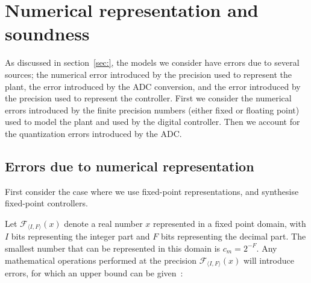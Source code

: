 \documentclass[twocolumn]{autart}    %
\begin{document}
\section{Numerical representation and soundness} 
\label{sec:numeric_rep}

As discussed in section~\ref{sec:}, the models we consider have errors due to several sources; the numerical error introduced by the precision used to represent the plant, the error introduced by the ADC conversion, and the error introduced by the precision used to represent the controller. First we consider the numerical errors introduced by the finite precision numbers (either fixed or floating point) used to model the plant and used by the digital controller. Then we account for the quantization errors introduced by the ADC.

\subsection{Errors due to numerical representation}
First consider the case where we use fixed-point representations, and synthesise fixed-point controllers. 

Let $\mathcal{F}_{\langle I,F \rangle}(x)$ denote a real number $x$
represented in a fixed point domain, with $I$ bits representing the integer
part and $F$ bits representing the decimal part.  The smallest number that
can be represented in this domain is $c_m=2^{-F}$.  Any mathematical
operations performed at the precision $\mathcal{F}_{\langle I,F \rangle}(x)$
will introduce errors, for which an upper bound can be
given~\cite{DBLP:conf/arith/BrainTRW15}:
\end{document}
